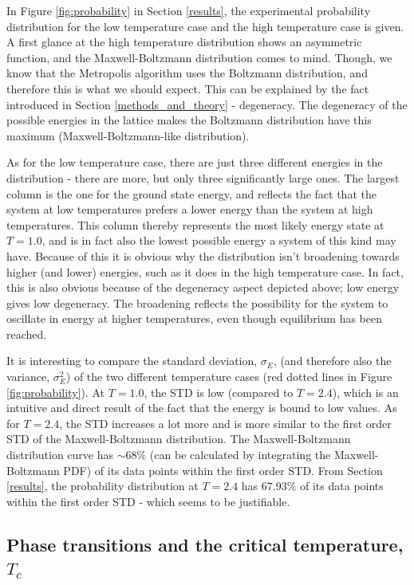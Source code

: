 \documentclass[12pt,english,a4paper]{article}
\begin{document}
In Figure \ref{fig:probability} in Section \ref{results}, the experimental probability distribution for the low temperature case and the high temperature case is given. A first glance at the high temperature distribution shows an asymmetric function, and the Maxwell-Boltzmann distribution comes to mind. Though, we know that the Metropolis algorithm uses the Boltzmann distribution, and therefore this is what we should expect. This can be explained by the fact introduced in Section \ref{methods_and_theory} - degeneracy. The degeneracy of the possible energies in the lattice makes the Boltzmann distribution have this maximum (Maxwell-Boltzmann-like distribution). 

As for the low temperature case, there are just three different energies in the distribution - there are more, but only three significantly large ones. The largest column is the one for the ground state energy, and reflects the fact that the system at low temperatures prefers a lower energy than the system at high temperatures. This column thereby represents the most likely energy state at $T=1.0$, and is in fact also the lowest possible energy a system of this kind may have. Because of this it is obvious why the distribution isn't broadening towards higher (and lower) energies, such as it does in the high temperature case. In fact, this is also obvious because of the degeneracy aspect depicted above; low energy gives low degeneracy. The broadening reflects the possibility for the system to oscillate in energy at higher temperatures, even though equilibrium has been reached.

It is interesting to compare the standard deviation, $\sigma_E$, (and therefore also the variance, $\sigma_E^2$) of the two different temperature cases (red dotted lines in Figure \ref{fig:probability}). At $T=1.0$, the STD is low (compared to $T=2.4$), which is an intuitive and direct result of the fact that the energy is bound to low values. As for $T=2.4$, the STD increases a lot more and is more similar to the first order STD of the Maxwell-Boltzmann distribution. The Maxwell-Boltzmann distribution curve has $\sim 68\%$ (can be calculated by integrating the Maxwell-Boltzmann PDF) of its data points within the first order STD. From Section \ref{results}, the probability distribution at $T=2.4$ has $67.93\%$ of its data points within the first order STD - which seems to be justifiable.

\subsection{Phase transitions and the critical temperature, $T_c$}
\end{document}
